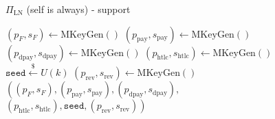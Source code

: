 \begin{figure}[!htbp]
\begin{protocolbox}{$\Pi_{\mathrm{LN}}$ (self is \alice{} always) - support}
\begin{algorithmic}[1]
       
        \State $\left(p_F, s_F\right) \gets \mathrm{MKeyGen}\left(\right)$
        \State $\left(p_{\mathrm{pay}}, s_{\mathrm{pay}}\right) \gets
        \mathrm{MKeyGen}\left(\right)$ 
        \State $\left(p_{\mathrm{dpay}}, s_{\mathrm{dpay}}\right) \gets
        \mathrm{MKeyGen}\left(\right)$ 
        \State $\left(p_{\mathrm{htlc}}, s_{\mathrm{htlc}}\right) \gets
        \mathrm{MKeyGen}\left(\right)$ 
        \State $\texttt{seed} \overset{\$}{\gets} U(k)$ 
        \State $\left(p_{\mathrm{rev}}, s_{\mathrm{rev}}\right) \gets
        \mathrm{MKeyGen}\left(\right)$ 
        \State \Return $\left(\left(p_F, s_F\right), \left(p_{\mathrm{pay}},
        s_{\mathrm{pay}}\right), \left(p_{\mathrm{dpay}},
        s_{\mathrm{dpay}}\right),\right.$
        \Indent
          \State $\left.\left(p_{\mathrm{htlc}}, s_{\mathrm{htlc}}\right),
          \mathtt{seed}, \left(p_{\mathrm{rev}}, s_{\mathrm{rev}}\right)\right)$
        \EndIndent
      \EndFunction
    \end{algorithmic}
  \end{protocolbox}
  \caption{}
  \label{alg:protocol:support}
\end{figure}

